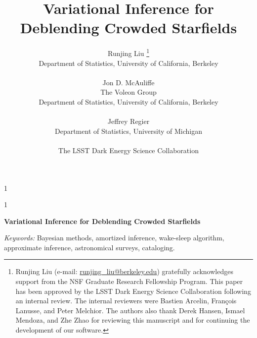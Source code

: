 \documentclass[12pt]{article}
\date{\vspace{-10px}}
\newcommand{\blind}{1}
\begin{document}
%

\def\spacingset#1{\renewcommand{\baselinestretch}%
{#1}\small\normalsize} \spacingset{1}


\blind
{
  \title{   \vspace{-30px}
\bf Variational Inference for Deblending Crowded Starfields}
  \author{Runjing Liu
  \thanks{
  Runjing Liu (e-mail: \url{runjing_liu@berkeley.edu}) gratefully acknowledges support from the NSF Graduate Research Fellowship Program.  
  This paper has been approved by the LSST Dark Energy Science Collaboration following an internal review. 
  The internal reviewers were 
  Bastien Arcelin,
  Fran\c{c}ois Lanusse, and 
  Peter Melchior. 
  The authors also thank Derek Hansen, Ismael Mendoza, and Zhe Zhao for reviewing this manuscript and for continuing the development of our software.
  }
  \hspace{.2cm}\\
    Department of Statistics, University of California, Berkeley\\
    \\
    Jon D. McAuliffe \\
    The Voleon Group \\
    Department of Statistics, University of California, Berkeley\\
    \\
    Jeffrey Regier \\
    Department of Statistics, University of Michigan\\
    \\
    The LSST Dark Energy Science Collaboration
    }
  \maketitle
} \fi

\blind
{
  \bigskip
  \bigskip
  \bigskip
  \begin{center}
    {\LARGE\bf Variational Inference for Deblending Crowded Starfields}
\end{center}
  \medskip
} \fi

\bigskip
\begin{abstract}

\end{abstract}

\noindent%
{\it Keywords:}  Bayesian methods, amortized inference, wake-sleep algorithm, approximate inference, astronomical surveys, cataloging. 
\end{document}
